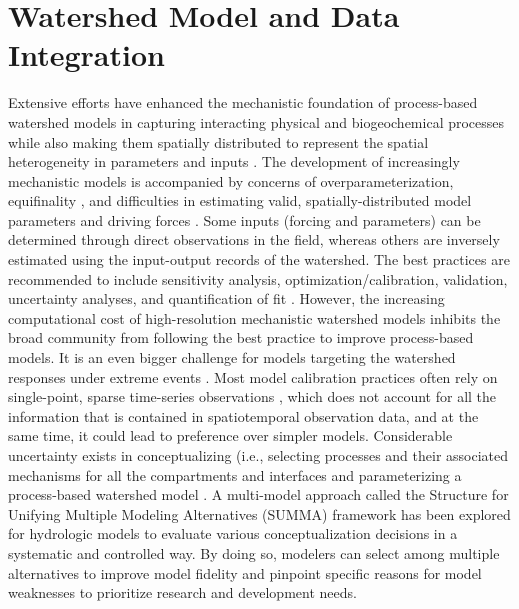 \documentclass[preprint,review, 12pt]{elsarticle}
\begin{document}
\section{Watershed Model and Data Integration}

Extensive efforts have enhanced the mechanistic foundation of process-based watershed models in capturing interacting physical and biogeochemical processes while also making them spatially distributed to represent the spatial heterogeneity in parameters and inputs \citep{Wellen2015}. The development of increasingly mechanistic models is accompanied by concerns of overparameterization, equifinality \citep{Jackson-Blakea, Beven1992b, Beven2006}, and difficulties in estimating valid, spatially-distributed model parameters and driving forces \citep{Kollet2008b, Samaniego2010, Montanari2012, Raleigh2015, Raleigh2016a}. Some inputs (forcing and parameters) can be determined through direct observations in the field, whereas others are inversely estimated using the input-output records of the watershed. The best practices are recommended to include sensitivity analysis, optimization/calibration, validation, uncertainty analyses, and quantification of fit \citep{Chapra2008b}. However, the increasing computational cost of high-resolution mechanistic watershed models inhibits the broad community from following the best practice to improve process-based models. It is an even bigger challenge for models targeting the watershed responses under extreme events \citep{Wellen2015}. Most model calibration practices often rely on single-point, sparse time-series observations \citep{Wellen2015, Robson2014b}, which does not account for all the information that is contained in spatiotemporal observation data, and at the same time, it could lead to preference over simpler models. Considerable uncertainty exists in conceptualizing (i.e., selecting processes and their associated mechanisms for all the compartments and interfaces and parameterizing a process-based watershed model \citep{McDonnell2007, Duncan}. A multi-model approach called the Structure for Unifying Multiple Modeling Alternatives (SUMMA)\citep{Clark2015d, Clark2015a} framework has been explored for hydrologic models \citep{Clark2015d, Fenicia2011c, Clark2008b} to evaluate various conceptualization decisions in a systematic and controlled way. By doing so, modelers can select among multiple alternatives to improve model fidelity and pinpoint specific reasons for model weaknesses to prioritize research and development needs. 
    
\end{document}
